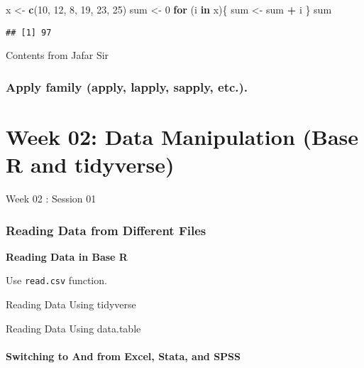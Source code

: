 \documentclass[
]{book}
\newenvironment{Shaded}{\begin{snugshade}}{\end{snugshade}}
\newcommand{\ControlFlowTok}[1]{\textcolor[rgb]{0.13,0.29,0.53}{\textbf{#1}}}
\newcommand{\DecValTok}[1]{\textcolor[rgb]{0.00,0.00,0.81}{#1}}
\newcommand{\KeywordTok}[1]{\textcolor[rgb]{0.13,0.29,0.53}{\textbf{#1}}}
\newcommand{\NormalTok}[1]{#1}
\newcommand{\OperatorTok}[1]{\textcolor[rgb]{0.81,0.36,0.00}{\textbf{#1}}}
\newcommand{\StringTok}[1]{\textcolor[rgb]{0.31,0.60,0.02}{#1}}
\begin{document}
\begin{Shaded}
\begin{Highlighting}[]
\NormalTok{x <-}\StringTok{ }\KeywordTok{c}\NormalTok{(}\DecValTok{10}\NormalTok{, }\DecValTok{12}\NormalTok{, }\DecValTok{8}\NormalTok{, }\DecValTok{19}\NormalTok{, }\DecValTok{23}\NormalTok{, }\DecValTok{25}\NormalTok{)}
\NormalTok{sum <-}\StringTok{ }\DecValTok{0}
\ControlFlowTok{for}\NormalTok{ (i }\ControlFlowTok{in}\NormalTok{ x)\{}
\NormalTok{  sum <-}\StringTok{ }\NormalTok{sum }\OperatorTok{+}\StringTok{ }\NormalTok{i}
\NormalTok{\}}
\NormalTok{sum}
\end{Highlighting}
\end{Shaded}

\begin{verbatim}
## [1] 97
\end{verbatim}

{Contents from Jafar Sir}

\hypertarget{apply-family-apply-lapply-sapply-etc..}{%
\subsection{Apply family (apply, lapply, sapply, etc.).}\label{apply-family-apply-lapply-sapply-etc..}}

\hypertarget{week-02-data-manipulation-base-r-and-tidyverse}{%
\chapter{Week 02: Data Manipulation (Base R and tidyverse)}\label{week-02-data-manipulation-base-r-and-tidyverse}}

Week 02 : Session 01

\hypertarget{reading-data-from-different-files}{%
\subsection{Reading Data from Different Files}\label{reading-data-from-different-files}}

\textbf{Reading Data in Base R}

Use \texttt{read.csv} function.

Reading Data Using tidyverse

Reading Data Using data.table

\hypertarget{switching-to-and-from-excel-stata-and-spss}{%
\subsubsection{Switching to And from Excel, Stata, and SPSS}\label{switching-to-and-from-excel-stata-and-spss}}
\end{document}
